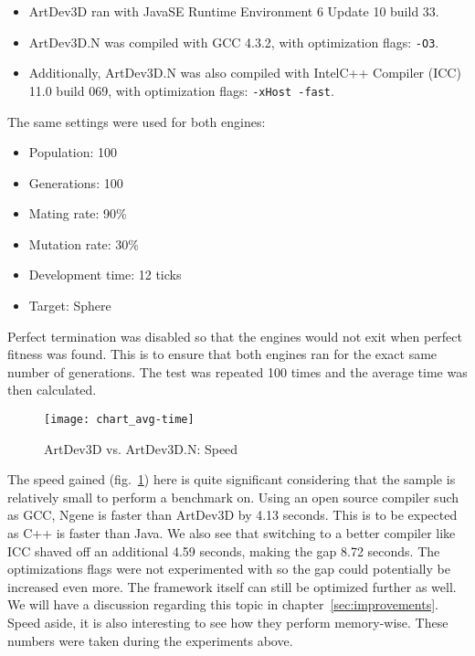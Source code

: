 \begin{itemize}
	\itemsep=0pt
	\item ArtDev3D ran with Java\texttrademark SE Runtime Environment 6 Update 10 build 33.
	\item ArtDev3D.N was compiled with GCC 4.3.2, with optimization flags: \texttt{-O3}.
	\item Additionally, ArtDev3D.N was also compiled with Intel\textregistered C++ Compiler (ICC) 11.0 build 069, with optimization flags: \texttt{-xHost -fast}.
\end{itemize}

The same settings were used for both engines:

\begin{itemize}
	\itemsep=-2pt
	\item Population: 100
	\item Generations: 100
	\item Mating rate: 90\%
	\item Mutation rate: 30\%
	\item Development time: 12 ticks
	\item Target: Sphere
\end{itemize}

Perfect termination was disabled so that the engines would not exit when perfect fitness was found. This is to ensure that both engines ran for the exact same number of generations. The test was repeated 100 times and the average time was then calculated.

\begin{figure}[!ht]
	\centering
	\texttt{[image: chart\_avg-time]}
	\caption{ArtDev3D vs. ArtDev3D.N: Speed}
	\label{fig:chart_avg-time}
\end{figure}

The speed gained (fig.~\ref{fig:chart_avg-time}) here is quite significant considering that the sample is relatively small to perform a benchmark on. Using an open source compiler such as GCC, Ngene is faster than ArtDev3D by 4.13 seconds. This is to be expected as C++ is faster than Java. We also see that switching to a better compiler like ICC shaved off an additional 4.59 seconds, making the gap 8.72 seconds. The optimizations flags were not experimented with so the gap could potentially be increased even more. The framework itself can still be optimized further as well. We will have a discussion regarding this topic in chapter~\ref{sec:improvements}. Speed aside, it is also interesting to see how they perform memory-wise. These numbers were taken during the experiments above.

